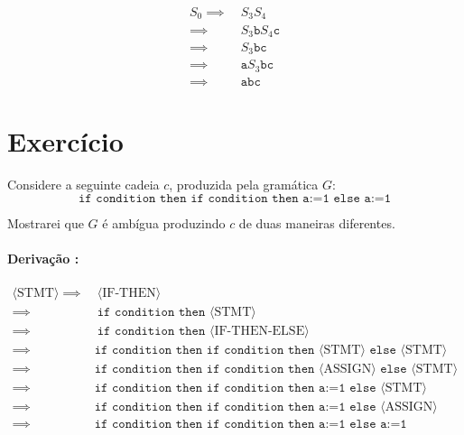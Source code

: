 \documentclass[a4paper, 12pt]{article}
\newcommand{\rom}[1]{\uppercase\expandafter{\romannumeral #1\relax}}
\begin{document}
\begin{align*}
    S_0 \implies & \: S_3S_4 \\
    \implies & \: S_3\texttt{b}S_4\texttt{c} \\
    \implies & \: S_3\texttt{bc} \\
    \implies & \: \texttt{a}S_3\texttt{bc} \\
    \implies & \: \texttt{abc}
\end{align*}

\newpage
\section*{Exercício \rom{3}} \label{sec:ex3}

Considere a seguinte cadeia $c$, produzida pela gramática $G$:
\begin{equation*}
    \texttt{if condition then if condition then a:=1 else a:=1}
\end{equation*}

Mostrarei que $G$ é ambígua produzindo $c$ de duas maneiras
diferentes.

\paragraph{Derivação \rom{1}:}

{\footnotesize
\begin{align*}
    \langle \text{STMT} \rangle \implies & \: \langle \text{IF-THEN} \rangle \\
    \implies & \: \texttt{if condition then } \langle \text{STMT} \rangle \\
    \implies & \: \texttt{if condition then } \langle \text{IF-THEN-ELSE} \rangle \\
    \implies & \texttt{if condition then if condition then } \langle \text{STMT} \rangle\texttt{ else } \langle \text{STMT} \rangle \\
    \implies & \texttt{if condition then if condition then } \langle \text{ASSIGN} \rangle\texttt{ else } \langle \text{STMT} \rangle \\
    \implies & \texttt{if condition then if condition then a:=1 else } \langle \text{STMT} \rangle \\
    \implies & \texttt{if condition then if condition then a:=1 else } \langle \text{ASSIGN} \rangle \\
    \implies & \texttt{if condition then if condition then a:=1 else a:=1}
\end{align*}
}%
\end{document}
